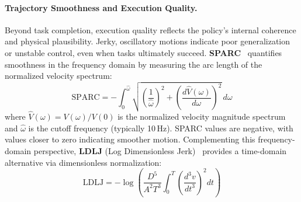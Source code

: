 \documentclass[acmsmall,screen,review,anonymous]{acmart}
\begin{document}
\paragraph{Trajectory Smoothness and Execution Quality.}
Beyond task completion, execution quality reflects the policy's internal coherence and physical plausibility. Jerky, oscillatory motions indicate poor generalization or unstable control, even when tasks ultimately succeed. \textbf{SPARC}~\cite{balasubramanian2015sparc} quantifies smoothness in the frequency domain by measuring the arc length of the normalized velocity spectrum:
\begin{equation}
  \text{SPARC} = -\int_0^{\hat\omega} \sqrt{\left(\frac{1}{\hat\omega}\right)^2 + \left(\frac{d\hat{V}(\omega)}{d\omega}\right)^2}\, d\omega
\end{equation}
where $\hat{V}(\omega) = V(\omega)/V(0)$ is the normalized velocity magnitude spectrum and $\hat\omega$ is the cutoff frequency (typically 10\,Hz). SPARC values are negative, with values closer to zero indicating smoother motion. Complementing this frequency-domain perspective, \textbf{LDLJ} (Log Dimensionless Jerk)~\cite{antonelli2023movement} provides a time-domain alternative via dimensionless normalization:
\begin{equation}
  \text{LDLJ} = -\log\left(\frac{D^5}{A^2 T^3} \int_0^T \left(\frac{d^3 v}{dt^3}\right)^2 dt\right)
\end{equation}
\end{document}
